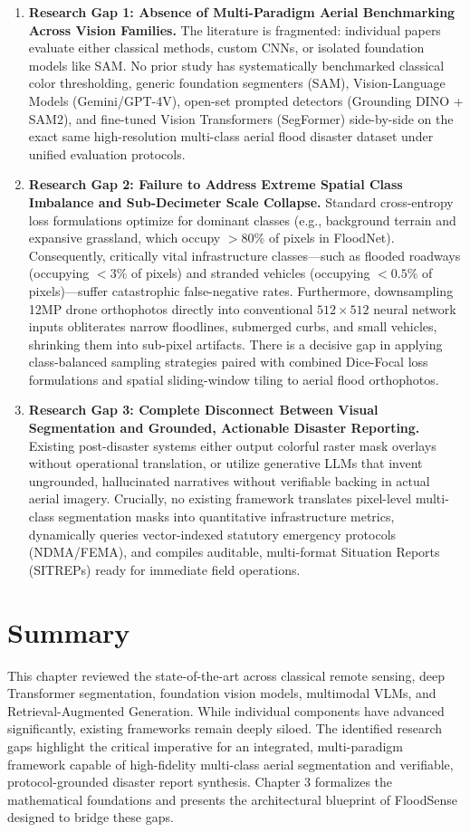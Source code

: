 \begin{enumerate}
    \item \textbf{Research Gap 1: Absence of Multi-Paradigm Aerial Benchmarking Across Vision Families.} 
    The literature is fragmented: individual papers evaluate either classical methods, custom CNNs, or isolated foundation models like SAM. No prior study has systematically benchmarked classical color thresholding, generic foundation segmenters (SAM), Vision-Language Models (Gemini/GPT-4V), open-set prompted detectors (Grounding DINO + SAM2), and fine-tuned Vision Transformers (SegFormer) side-by-side on the exact same high-resolution multi-class aerial flood disaster dataset under unified evaluation protocols.
    
    \item \textbf{Research Gap 2: Failure to Address Extreme Spatial Class Imbalance and Sub-Decimeter Scale Collapse.} 
    Standard cross-entropy loss formulations optimize for dominant classes (e.g., background terrain and expansive grassland, which occupy $>80\%$ of pixels in FloodNet). Consequently, critically vital infrastructure classes—such as flooded roadways (occupying $<3\%$ of pixels) and stranded vehicles (occupying $<0.5\%$ of pixels)—suffer catastrophic false-negative rates. Furthermore, downsampling 12MP drone orthophotos directly into conventional $512 \times 512$ neural network inputs obliterates narrow floodlines, submerged curbs, and small vehicles, shrinking them into sub-pixel artifacts. There is a decisive gap in applying class-balanced sampling strategies paired with combined Dice-Focal loss formulations and spatial sliding-window tiling to aerial flood orthophotos.
    
    \item \textbf{Research Gap 3: Complete Disconnect Between Visual Segmentation and Grounded, Actionable Disaster Reporting.} 
    Existing post-disaster systems either output colorful raster mask overlays without operational translation, or utilize generative LLMs that invent ungrounded, hallucinated narratives without verifiable backing in actual aerial imagery. Crucially, no existing framework translates pixel-level multi-class segmentation masks into quantitative infrastructure metrics, dynamically queries vector-indexed statutory emergency protocols (NDMA/FEMA), and compiles auditable, multi-format Situation Reports (SITREPs) ready for immediate field operations.
\end{enumerate}

\section{Summary}
This chapter reviewed the state-of-the-art across classical remote sensing, deep Transformer segmentation, foundation vision models, multimodal VLMs, and Retrieval-Augmented Generation. While individual components have advanced significantly, existing frameworks remain deeply siloed. The identified research gaps highlight the critical imperative for an integrated, multi-paradigm framework capable of high-fidelity multi-class aerial segmentation and verifiable, protocol-grounded disaster report synthesis. Chapter 3 formalizes the mathematical foundations and presents the architectural blueprint of FloodSense designed to bridge these gaps.
